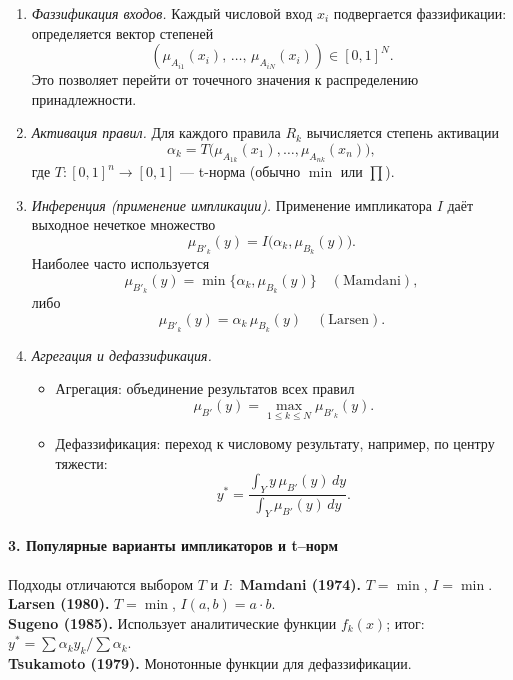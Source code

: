 \begin{enumerate}
  \item \emph{Фаззификация входов.}
    Каждый числовой вход $x_i$ подвергается фаззификации:
    определяется вектор степеней
    $$
      (\mu_{A_{i1}}(x_i), \,\ldots, \,\mu_{A_{iN}}(x_i))
      \in [0,1]^N.
    $$
    Это позволяет перейти от точечного значения к распределению принадлежности.

  \item \emph{Активация правил.}
    Для каждого правила $R_k$ вычисляется степень активации
    \begin{equation}
      \alpha_k
      = T\bigl(\mu_{A_{1k}}(x_1),\dots,\mu_{A_{nk}}(x_n)\bigr),
      \label{eq:activation}
    \end{equation}
    где $T:[0,1]^n\to[0,1]$ — t-норма (обычно $\min$ или $\prod$).

  \item \emph{Инференция (применение импликации).}
    Применение импликатора $I$ даёт выходное нечеткое множество
    \begin{equation}
      \mu_{B'_k}(y)
      = I\bigl(\alpha_k,\mu_{B_k}(y)\bigr).
      \label{eq:inference}
    \end{equation}
    Наиболее часто используется
    $$
      \mu_{B'_k}(y)=\min\{\alpha_k,\mu_{B_k}(y)\}\quad(\text{Mamdani}),
    $$
    либо
    $$
      \mu_{B'_k}(y)=\alpha_k\,\mu_{B_k}(y)\quad(\text{Larsen}).
    $$

  \item \emph{Агрегация и дефаззификация.}
  \begin{itemize}
    \item Агрегация: объединение результатов всех правил
    $$
      \mu_{B'}(y)
      = \max_{1\le k\le N}\mu_{B'_k}(y).
    $$
    \item Дефаззификация: переход к числовому результату,
    например, по центру тяжести:
    \begin{equation}
      y^*
      = \displaystyle\frac{\int_Y y\,\mu_{B'}(y)\,dy}{\int_Y\mu_{B'}(y)\,dy}.
      \label{eq:defuzz_centroid}
    \end{equation}
  \end{itemize}
\end{enumerate}

\paragraph{3. Популярные варианты импликаторов и t–норм}
Подходы отличаются выбором $T$ и $I$:\
\textbf{Mamdani (1974).} $T=\min$, $I=\min$.\\
\textbf{Larsen (1980).} $T=\min$, $I(a,b)=a\cdot b$.\\
\textbf{Sugeno (1985).} Использует аналитические функции $f_k(x)$; итог:
$y^*=\sum\alpha_k y_k/\sum\alpha_k$.\\
\textbf{Tsukamoto (1979).} Монотонные функции для дефаззификации.

